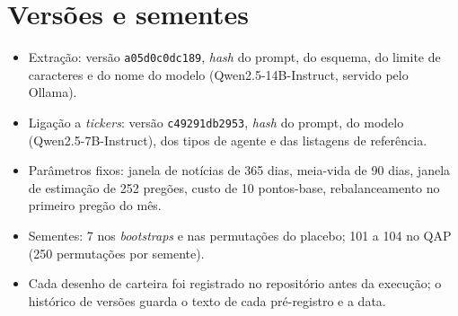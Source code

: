 \section{Versões e sementes}

\begin{itemize}
  \item Extração: versão \texttt{a05d0c0dc189}, \emph{hash} do prompt, do esquema, do limite de caracteres
        e do nome do modelo (Qwen2.5-14B-Instruct, servido pelo Ollama).
  \item Ligação a \emph{tickers}: versão \texttt{c49291db2953}, \emph{hash} do prompt, do modelo
        (Qwen2.5-7B-Instruct), dos tipos de agente e das listagens de referência.
  \item Parâmetros fixos: janela de notícias de 365 dias, meia-vida de 90 dias, janela de estimação de
        252 pregões, custo de 10 pontos-base, rebalanceamento no primeiro pregão do mês.
  \item Sementes: 7 nos \emph{bootstraps} e nas permutações do placebo; 101 a 104 no QAP (250
        permutações por semente).
  \item Cada desenho de carteira foi registrado no repositório antes da execução; o histórico de versões
        guarda o texto de cada pré-registro e a data.
\end{itemize}

\clearpage

